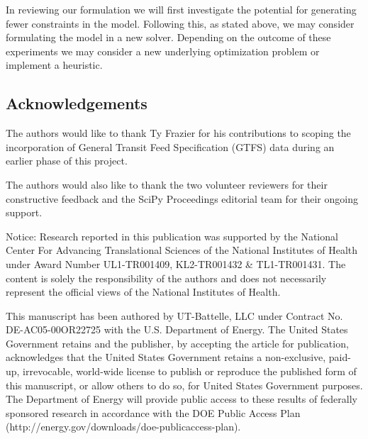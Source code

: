 \begin{itemize}
    In reviewing our formulation we will first investigate the potential for generating fewer constraints in the model. Following this, as stated above, we may consider formulating the model in a new solver. Depending on the outcome of these experiments we may consider a new underlying optimization problem or implement a heuristic.
\end{itemize}

\subsection{Acknowledgements}

The authors would like to thank Ty Frazier for his contributions to scoping the incorporation of General Transit Feed Specification (GTFS) data during an earlier phase of this project.

The authors would also like to thank the two volunteer reviewers for their constructive feedback and the SciPy Proceedings editorial team for their ongoing support.

Notice: Research reported in this publication was supported by the National Center For Advancing Translational Sciences of the National Institutes of Health under Award Number UL1-TR001409, KL2-TR001432 \& TL1-TR001431. The content is solely the responsibility of the authors and does not necessarily represent the official views of the National Institutes of Health.

This manuscript has been authored by UT-Battelle, LLC under Contract No. DE-AC05-00OR22725 with the U.S. Department of Energy. The United States Government retains and the publisher, by accepting the article for publication, acknowledges that the United States Government retains a non-exclusive, paid-up, irrevocable, world-wide license to publish or reproduce the published form of this manuscript, or allow others to do so, for United States Government purposes. The Department of Energy will provide public access to these results of federally sponsored research in accordance with the DOE Public Access Plan (http://energy.gov/downloads/doe-publicaccess-plan).

